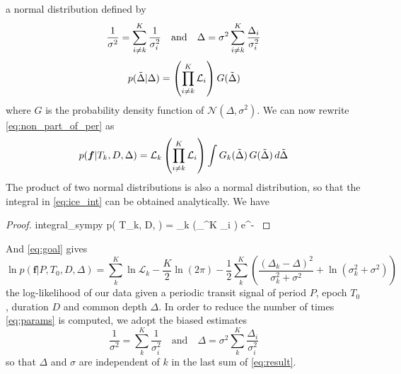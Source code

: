 \documentclass{aastex631}
\begin{document}
a normal distribution defined by
\begin{equation}\label{eq:params}
\frac{1}{\sigma^2} = \sum_{\sumTk}^K \frac{1}{\sigma_i^2} \quad \text{and} \quad
\Delta =\sigma^2 \sum_{\sumTk}^K {\frac{\Delta_i}{\sigma_i^2}}
\end{equation}
$$p(\tilde\Delta | \Delta) =  \left(\prod_{i\neq k}^K \mathcal{L}_i \right) G(\tilde\Delta)$$
where $G$ is the probability density function of $\mathcal{N}(\Delta, \sigma^2)$. We can now rewrite \autoref{eq:non_part_of_per} as
\begin{equation}\label{eq:ice_int}
    p(\bm{f} \vert T_k, D, \Delta) =   \mathcal{L}_k \left(\prod_{\sumTk}^K \mathcal{L}_i \right)  \int G_k(\tilde\Delta)\, G(\tilde\Delta)\, d\tilde\Delta
\end{equation}
The product of two normal distributions is also a normal distribution, so that the integral in \autoref{eq:ice_int} can be obtained analytically. We have
\begin{proof}{integral_sympy}
    p( \vert T_k, D, \Delta) =   _k \left(\prod_{\sumTk}^K _i  \right)  e^{- }
\end{proof}
And \autoref{eq:goal} gives 
\begin{equation}\label{eq:result}
    \ln p(\bm{f} \vert P, T_0 ,D, \Delta) =  \sum_{k}^K \ln \mathcal{L}_k  - \frac{K}{2}\ln(2\pi) - \frac{1}{2}\sum_k^K \left( \frac{\left(\Delta_{k} -
    \Delta\right)^{2}}{\sigma_k^{2} + \sigma^{2}} + \ln{\left(\sigma_k^{2} + \sigma^{2} \right)} \right)
\end{equation}
the log-likelihood of our data given a periodic transit signal of period $P$, epoch $T_0$, duration $D$ and common depth $\Delta$. In order to reduce the number of times \autoref{eq:params} is computed, we adopt the biased estimates
$$\frac{1}{\sigma^2} = \sum_{k}^K \frac{1}{\sigma_i^2} \quad \text{and} \quad \Delta  = \sigma^2 \sum_{k}^K {\frac{\Delta_i}{\sigma_i^2}}$$
so that $\Delta$ and $\sigma$ are independent of $k$ in the last sum of \autoref{eq:result}.


\end{document}
